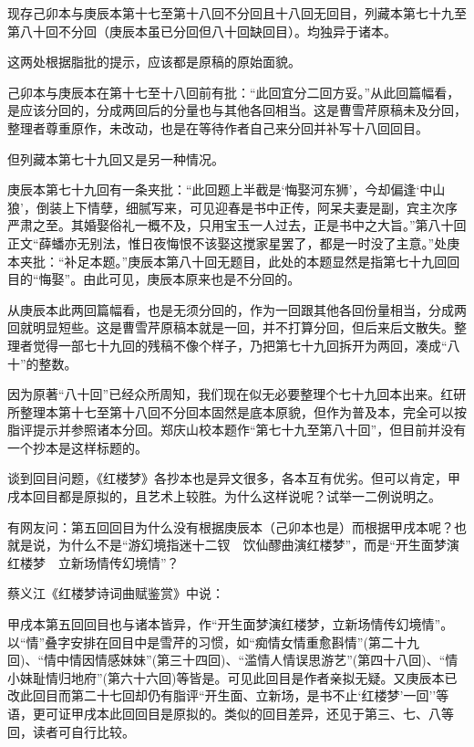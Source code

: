 {}
现存己卯本与庚辰本第十七至第十八回不分回且十八回无回目，列藏本第七十九至第八十回不分回（庚辰本虽已分回但八十回缺回目）。均独异于诸本。

这两处根据脂批的提示，应该都是原稿的原始面貌。

己卯本与庚辰本在第十七至十八回前有批：``此回宜分二回方妥。''从此回篇幅看，是应该分回的，分成两回后的分量也与其他各回相当。这是曹雪芹原稿未及分回，整理者尊重原作，未改动，也是在等待作者自己来分回并补写十八回回目。

但列藏本第七十九回又是另一种情况。

庚辰本第七十九回有一条夹批：``此回题上半截是`悔娶河东狮'，今却偏逢`中山狼'，倒装上下情孽，细腻写来，可见迎春是书中正传，阿呆夫妻是副，宾主次序严肃之至。其婚娶俗礼一概不及，只用宝玉一人过去，正是书中之大旨。''第八十回正文``薛蟠亦无别法，惟日夜悔恨不该娶这搅家星罢了，都是一时没了主意。''处庚本夹批：``补足本题。''庚辰本第八十回无题目，此处的本题显然是指第七十九回回目的``悔娶''。由此可见，庚辰本原来也是不分回的。

从庚辰本此两回篇幅看，也是无须分回的，作为一回跟其他各回份量相当，分成两回就明显短些。这是曹雪芹原稿本就是一回，并不打算分回，但后来后文散失。整理者觉得一部七十九回的残稿不像个样子，乃把第七十九回拆开为两回，凑成``八十''的整数。

因为原著``八十回''已经众所周知，我们现在似无必要整理个七十九回本出来。红研所整理本第十七至第十八回不分回本固然是底本原貌，但作为普及本，完全可以按脂评提示并参照诸本分回。郑庆山校本题作``第七十九至第八十回''，但目前并没有一个抄本是这样标题的。

{{}}

谈到回目问题，《红楼梦》各抄本也是异文很多，各本互有优劣。但可以肯定，甲戌本回目都是原拟的，且艺术上较胜。为什么这样说呢？试举一二例说明之。

有网友问：第五回回目为什么没有根据庚辰本（己卯本也是）而根据甲戌本呢？也就是说，为什么不是``游幻境指迷十二钗　饮仙醪曲演红楼梦''，而是``开生面梦演红楼梦　立新场情传幻境情''？

蔡义江《红楼梦诗词曲赋鉴赏》中说：

甲戌本第五回回目也与诸本皆异，作``开生面梦演红楼梦，立新场情传幻境情''。以``情''叠字安排在回目中是雪芹的习惯，如``痴情女情重愈斟情''(第二十九回)、``情中情因情感妹妹''(第三十四回)、``滥情人情误思游艺''(第四十八回)、``情小妹耻情归地府''(第六十六回)等皆是。可见此回目是作者亲拟无疑。又庚辰本已改此回目而第二十七回却仍有脂评``开生面、立新场，是书不止`红楼梦'一回''等语，更可证甲戌本此回回目是原拟的。类似的回目差异，还见于第三、七、八等回，读者可自行比较。

